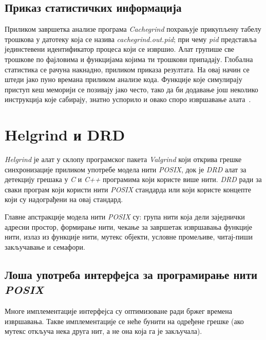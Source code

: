 \documentclass[12pt,oneside]{memoir}
\begin{document}
\subsection{Приказ статистичких информација}

\indent Приликом завршетка анализе програма \textit{Cachegrind} похрањује прикупљену табелу трошкова у датотеку која се назива \textit{cachegrind.out.pid}; при чему \textit{pid} представља јединстевени идентификатор процеса који се извршио. Алат групише све трошкове по фајловима и функцијама којима ти трошкови припадају. Глобална статистика се рачуна накнадно, приликом приказа резултата. На овај начин се штеди јако пуно времана приликом анализе кода. Функције које симулирају приступ кеш меморији се позивају јако често, тако да би додавање још неколико инструкција које сабирају, знатно успорило и овако споро извршавање алата~\cite{cachegrindRef}.

\section{Helgrind и DRD}
\label{section_helgrind}

\indent \textit{Helgrind} је алат у склопу програмског пакета \textit{Valgrind} који открива грешке синхронизације приликом употребе модела нити \textit{POSIX}, док је \textit{DRD} алат за детекцију грешака у \textit{C} и \textit{C++} програмима који користе више нити. \textit{DRD} ради за сваки програм који користи нити \textit{POSIX} стандарда или који користе концепте који су надограђени на овај стандард.

\indent Главне апстракције модела нити \textit{POSIX} су: група нити која дели заједнички адресни простор, формирање нити, чекање за завршетак извршавања функције нити, излаз из функције нити, мутекс објекти, условне промељиве, читај-пиши закључавање и семафори.

\subsection{Лоша употреба интерфејса за програмирање нити \textit{POSIX}}

\indent Многе имплементације интерфејса су оптимизоване ради бржег времена извршавања. Такве имплементације се неће бунити на одређене грешке (ако мутекс откључа нека друга нит, а не она која га је закључала).
\end{document}
